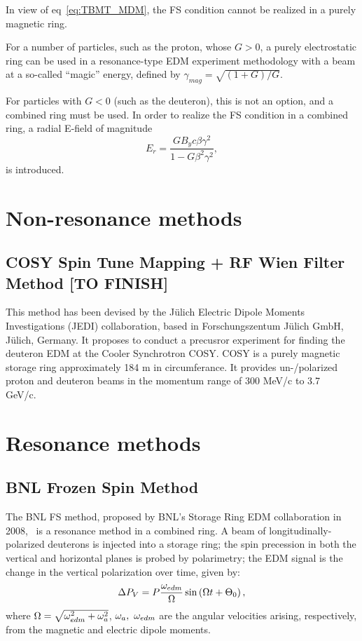 \documentclass{article}
\begin{document}
In view of eq~\eqref{eq:TBMT_MDM}, the FS condition cannot be realized in a purely magnetic ring.

For a number of particles, such as the proton, whose $G>0$, a purely electrostatic ring can be used in a resonance-type EDM experiment methodology with a beam at a so-called ``magic'' energy, defined by $\gamma_{mag} = \sqrt{(1+G)/G}$.

For particles with $G<0$ (such as the deuteron), this is not an option, and a combined ring must be used. In order to realize the FS condition in a combined ring, a radial E-field of magnitude
\begin{equation}\label{eq:FS_Er}
  E_r = \frac{GB_yc\beta\gamma^2}{1-G\beta^2\gamma^2},
\end{equation}
is introduced.~\cite{BNL:Deuteron2008}

\section{Non-resonance methods}

\subsection{COSY Spin Tune Mapping + RF Wien Filter Method [TO FINISH]}
This method has been devised by the J\"ulich Electric Dipole Moments Investigations (JEDI) collaboration, based in Forschungszentum J\"ulich GmbH, J\"ulich, Germany. It proposes to conduct a precusror experiment for finding the deuteron EDM at the Cooler Synchrotron COSY. COSY is a purely magnetic storage ring approximately 184 m in circumferance. It provides un-/polarized proton and deuteron beams in the momentum range of 300 MeV/c to 3.7 GeV/c.~\cite{COSY:ElectronCooling}

\section{Resonance methods}

\subsection{BNL Frozen Spin Method}
The BNL FS method, proposed by BNL's Storage Ring EDM collaboration in 2008,~\cite{BNL:Deuteron2008} is a resonance method in a combined ring. A beam of longitudinally-polarized deuterons is injected into a storage ring; the spin precession in both the vertical and horizontal planes  is probed by polarimetry; the EDM signal is the change in the vertical polarization over time, given by:~\citep[p.~8]{BNL:Deuteron2008}
\begin{equation}
  \Delta P_V = P\frac{\w_{edm}}{\W}\sin\bkt{\W t + \Theta_0},
\end{equation}
where $\Omega = \sqrt{\omega_{edm}^2 + \omega_a^2}$, $\omega_a,~\omega_{edm}$ are the angular velocities arising, respectively, from the magnetic and electric dipole moments.
\end{document}
